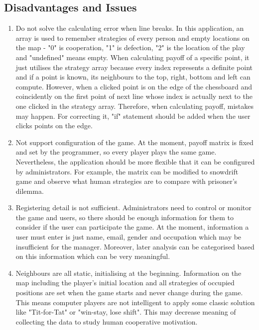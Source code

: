 \subsection{Disadvantages and Issues} \label{Subsubsection: dis}
\begin{enumerate}
\item Do not solve the calculating error when line breaks. In this application, an array is used to remember strategies of every person and empty locations on the map - "0" is cooperation, "1" is defection, "2" is the location of the play and "undefined" means empty. When calculating payoff of a specific point, it just utilises the strategy array because every index represents a definite point and if a point is known, its neighbours to the top, right, bottom and left can compute. However, when a clicked point is on the edge of the chessboard and coincidently on the first point of next line whose index is actually next to the one clicked in the strategy array. Therefore, when calculating payoff, mistakes may happen. For correcting it, "if" statement should be added when the user clicks points on the edge.
\item Not support configuration of the game. At the moment, payoff matrix is fixed and set by the programmer, so every player plays the same game. Nevertheless, the application should be more flexible that it can be configured by administrators. For example, the matrix can be modified to snowdrift game and observe what human strategies are to compare with prisoner's dilemma.
\item Registering detail is not sufficient. Administrators need to control or monitor the game and users, so there should be enough information for them to consider if the user can participate the game. At the moment, information a user must enter is just name, email, gender and occupation which may be insufficient for the manager. Moreover, later analysis can be categorised based on this information which can be very meaningful.
\item Neighbours are all static, initialising at the beginning. Information on the map including the player's initial location and all strategies of occupied positions are set when the game starts and never change during the game. This means computer players are not intelligent to apply some classic solution like "Tit-for-Tat" or "win-stay, lose shift". This may decrease meaning of collecting the data to study human cooperative motivation.
\end{enumerate}

